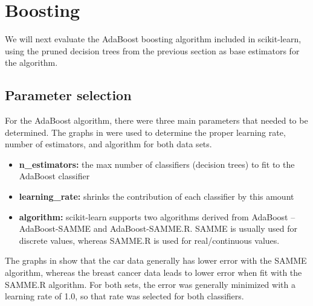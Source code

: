 \documentclass{article}
\begin{document}
    \section{Boosting}
    We will next evaluate the AdaBoost boosting algorithm included in scikit-learn, using the pruned decision trees from the previous section as base estimators for the algorithm.

    \subsection{Parameter selection}
    For the AdaBoost algorithm, there were three main parameters that needed to be determined. The graphs in  were used to determine the proper learning rate, number of estimators, and algorithm for both data sets.

    \begin{itemize}
        \item \textbf{n\_estimators:} the max number of classifiers (decision trees) to fit to the AdaBoost classifier
        \item \textbf{learning\_rate:} shrinks the contribution of each classifier by this amount
        \item \textbf{algorithm:} scikit-learn supports two algorithms derived from AdaBoost -- AdaBoost-SAMME and AdaBoost-SAMME.R. SAMME is usually used for discrete values, whereas SAMME.R is used for real/continuous values. 
    \end{itemize}

    The graphs in  show that the car data generally has lower error with the SAMME algorithm, whereas the breast cancer data leads to lower error when fit with the SAMME.R algorithm. For both sets, the error was generally minimized with a learning rate of 1.0, so that rate was selected for both classifiers.
\end{document}
